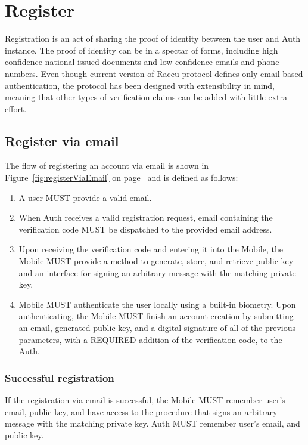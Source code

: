 \section{Register}
Registration is an act of sharing the proof of identity between the user and Auth instance. The proof of identity
can be in a spectar of forms, including high confidence national issued documents and low confidence emails and 
phone numbers. Even though current version of Raccu protocol defines only email based authentication, the protocol
has been designed with extensibility in mind, meaning that other types of verification claims can be added with
little extra effort.

      \subsection{Register via email}
      The flow of registering an account via email is shown in Figure~\ref{fig:registerViaEmail} on 
      page~\pageref{fig:registerViaEmail} and is defined as follows:
      \begin{enumerate}
            \item A user MUST provide a valid email.
            \item When Auth receives a valid registration request, email containing the verification code MUST 
                  be dispatched to the provided email address.
            \item Upon receiving the verification code and entering it into the Mobile, the Mobile MUST provide 
                  a method to generate, store, and retrieve public key and an interface for signing an arbitrary 
                  message with the matching private key.
            \item Mobile MUST authenticate the user locally using a built-in biometry. Upon authenticating, 
                  the Mobile MUST finish an account creation by submitting an email, generated public key, 
                  and a digital signature of all of the previous parameters, with a REQUIRED addition of the 
                  verification code, to the Auth.
      \end{enumerate}
                 
      
            \subsubsection{Successful registration}
            If the registration via email is successful, the Mobile MUST remember user's email, public key, and 
            have access to the procedure that signs an arbitrary message with the matching private key. Auth MUST 
            remember user's email, and public key.

